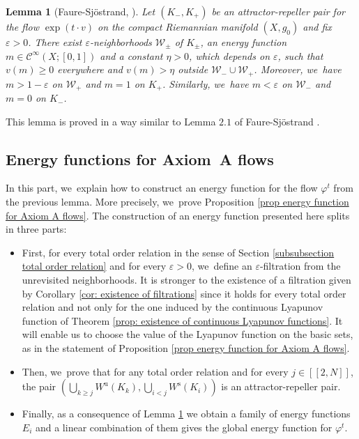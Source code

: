 \documentclass[11pt]{article}
\newcommand{\lcr}{[\![}
\newcommand{\rcr}{]\!]}
\newcommand{\rs}{\mathrm{s}}
\newcommand{\ru}{\mathrm{u}}
\theoremstyle{definition}
\theoremstyle{plain}
\newtheorem{lemma}[definition]{Lemma}
\newcommand{\Ccal}{\mathcal{C}}
\newcommand{\Wcal}{\mathcal{W}}
\begin{document}
\begin{lemma}[{Faure-Sjöstrand, \cite{FS}}]\label{lemma: energy function for attractor-repeller model}
Let $(K_-,K_+)$ be an attractor-repeller pair for the flow $\exp (t\cdot v)$ on the compact Riemannian manifold $(X,g_0)$ and fix $\varepsilon > 0$. There exist $\varepsilon$-neighborhoods $\Wcal_{\pm}$ of $K_{\pm}$, an energy function $m \in \Ccal^{\infty} (X; [0,1])$ and a constant $\eta > 0$, which depends on $\varepsilon$, such that $v (m) \geq 0$ everywhere and $v (m) > \eta$ outside $\Wcal_{-} \cup \Wcal_{+}$. Moreover, we~have $m > 1 - \varepsilon$ on $\Wcal_{+}$ and $m = 1$ on $K_+$. Similarly, we~have $m < \varepsilon$ on $\Wcal_{-}$ and $m = 0$ on $K_-$.
\end{lemma}

This lemma is proved in a way similar to Lemma $2.1$ of Faure-Sjöstrand \cite[p.\,336]{FS}.

\subsection{Energy functions for Axiom~A flows}

In this part, we~explain how to construct an energy function for the flow $\varphi^t$ from the previous lemma. More precisely, we~prove Proposition \ref{prop energy function for Axiom A flows}. The construction of an energy function presented here splits in three parts:
\begin{itemize}
\item First, for every total order relation in the sense of Section \ref{subsubsection total order relation} and for every $\varepsilon > 0$, we~define an $\varepsilon$-filtration from the unrevisited neighborhoods. It is stronger to the existence of a filtration given by Corollary \ref{cor: existence of filtrations} since it holds for every total order relation and not only for the one induced by the continuous Lyapunov function of Theorem \ref{prop: existence of continuous Lyapunov functions}. It will enable us to choose the value of the Lyapunov function on the basic sets, as in the statement of Proposition \ref{prop energy function for Axiom A flows}.
\item Then, we~prove that for any total order relation and for every $j\in\lcr2,N\rcr$, the pair $(\bigcup_{k \geq j}W^\ru (K_k), \bigcup_{i < j}W^\rs (K_i))$ is an attractor-repeller pair.
\item Finally, as a consequence of Lemma \ref{lemma: energy function for attractor-repeller model} we obtain a family of energy functions~$E_i$ and a linear combination of them gives the global energy function for $\varphi^t$.
\end{itemize}
\end{document}
